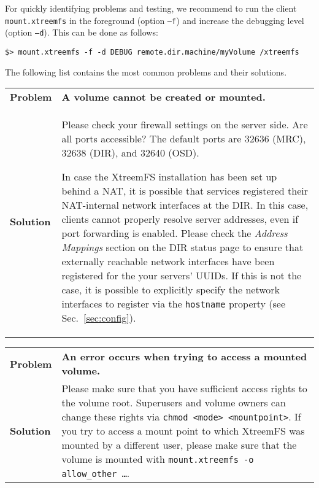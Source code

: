 \documentclass[a4paper,10pt]{book}
\begin{document}
For quickly identifying problems and testing, we recommend to run the client \texttt{mount.xtreemfs} in the foreground (option \texttt{--f}) and increase the debugging level (option \texttt{--d}). This can be done as follows:

\begin{verbatim}
$> mount.xtreemfs -f -d DEBUG remote.dir.machine/myVolume /xtreemfs
\end{verbatim}

The following list contains the most common problems and their solutions.

\begin{tabular}{lp{10cm}}
 \textbf{Problem}  & \textbf{A volume cannot be created or mounted.} \\
 \textbf{Solution} & Please check your firewall settings on the server side. Are all ports accessible? The default ports are 32636 (MRC), 32638 (DIR), and 32640 (OSD).

 In case the XtreemFS installation has been set up behind a NAT, it is possible that services registered their NAT-internal network interfaces at the DIR. In this case, clients cannot properly resolve server addresses, even if port forwarding is enabled. Please check the \emph{Address Mappings} section on the DIR status page to ensure that externally reachable network interfaces have been registered for the your servers' UUIDs. If this is not the case, it is possible to explicitly specify the network interfaces to register via the \texttt{hostname} property (see Sec.\ \ref{sec:config}).
\end{tabular}

\begin{tabular}{lp{10cm}}
 \textbf{Problem}  & \textbf{An error occurs when trying to access a mounted volume.} \\
 \textbf{Solution} & Please make sure that you have sufficient access rights to the volume root. Superusers and volume owners can change these rights via \texttt{chmod <mode> <mountpoint>}. If you try to access a mount point to which XtreemFS was mounted by a different user, please make sure that the volume is mounted with \texttt{mount.xtreemfs -o allow\_other \dots}.
\end{tabular}
\end{document}
